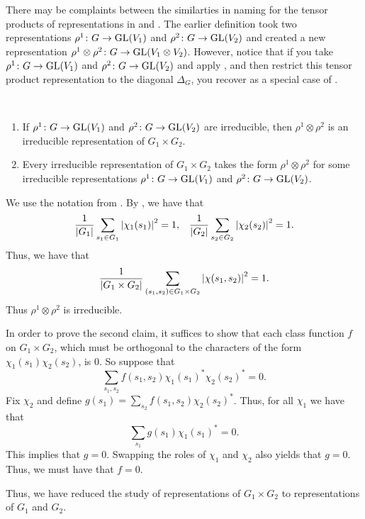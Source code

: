 \documentclass[letterpaper, 11pt, oneside]{book}
\begin{document}
There may be complaints between the similarties in naming for the tensor products of representations in  and .
The earlier definition took two representations $\rho^{1}\colon G \to \operatorname{GL}(V_{1})$ and $\rho^{2}\colon G \to \operatorname{GL}(V_{2})$ and created a new representation $\rho^{1} \otimes \rho^{2}\colon G \to \operatorname{GL}(V_{1} \otimes V_{2})$.
However, notice that if you take $\rho^{1}\colon G \to \operatorname{GL}(V_{1})$ and $\rho^{2}\colon G \to \operatorname{GL}(V_{2})$ and apply , and then restrict this tensor product representation to the diagonal $\Delta_{G}$, you recover  as a special case of .

\begin{thrm}\label{thrm:irred_reps_product}\
  \begin{enumerate}
  \item If $\rho^{1}\colon G \to \operatorname{GL}(V_{1})$ and $\rho^{2}\colon G \to \operatorname{GL}(V_{2})$ are irreducible, then $\rho^{1} \otimes \rho^{2}$ is an irreducible representation of $G_{1} \times G_{2}$.
  \item Every irreducible representation of $G_{1} \times G_{2}$ takes the form $\rho^{1} \otimes \rho^{2}$ for some irreducible representations $\rho^{1}\colon G \to \operatorname{GL}(V_{1})$ and $\rho^{2}\colon G \to \operatorname{GL}(V_{2})$.
  \end{enumerate}
\end{thrm}
\begin{pf}
  We use the notation from .
  By , we have that
  \begin{align*}
    \frac{1}{\abs{G_{1}}}\sum_{s_{1} \in G_{1}} \abs{\chi_{1}(s_{1})}^{2} = 1, && \frac{1}{\abs{G_{2}}}\sum_{s_{2} \in G_{2}} \abs{\chi_{2}(s_{2})}^{2} = 1.
  \end{align*}
  Thus, we have that
  \[
    \frac{1}{\abs{G_{1} \times G_{2}}}\sum_{(s_{1}, s_{2}) \in G_{1} \times G_{2}} \abs{\chi(s_{1}, s_{2})}^{2} = 1.
  \]
  Thus $\rho^{1} \otimes \rho^{2}$ is irreducible.

  In order to prove the second claim, it suffices to show that each class function $f$ on $G_{1} \times G_{2}$, which must be orthogonal to the characters of the form $\chi_{1}(s_{1}) \chi_{2}(s_{2})$, is $0$.
  So suppose that
  \[
      \sum_{s_{1}, s_{2}} f(s_{1}, s_{2}) \chi_{1}(s_{1})^{*} \chi_{2}(s_{2})^{*} = 0.
  \]
  Fix $\chi_{2}$ and define $g(s_{1}) = \sum_{s_{2}} f(s_{1}, s_{2}) \chi_{2}(s_{2})^{*}$.
  Thus, for all $\chi_{1}$ we have that
  \[
    \sum_{s_{1}} g(s_{1}) \chi_{1}(s_{1})^{*} = 0.
  \]
  This implies that $g = 0$.
  Swapping the roles of $\chi_{1}$ and $\chi_{2}$ also yields that $g = 0$.
  Thus, we must have that $f = 0$.
\end{pf}
Thus, we have reduced the study of representations of $G_{1} \times G_{2}$ to representations of $G_{1}$ and $G_{2}$.
\end{document}
